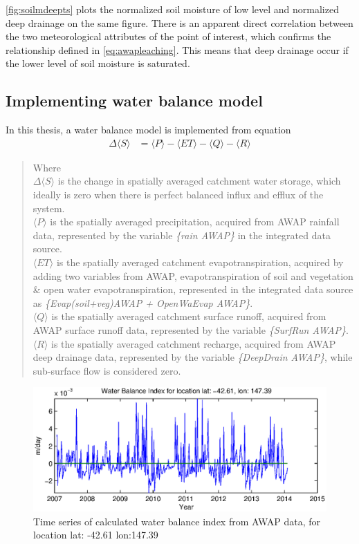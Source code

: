 \autoref{fig:soilmdeepts} plots the normalized soil moisture of low level and normalized deep drainage on the same figure. There is an apparent direct correlation between the two meteorological attributes of the point of interest, which confirms the relationship defined in \autoref{eq:awapleaching}. This means that deep drainage occur if the lower level of soil moisture is saturated.
\subsection{Implementing water balance model}
In this thesis, a water balance model is implemented from equation 
\begin{align}
	\Delta \langle S\rangle &= \langle P\rangle - \langle ET\rangle-\langle Q\rangle-\langle R\rangle
	\label{eq:wbsimple}
\end{align}
\begin{quote}Where \\
\indent$\Delta \langle S\rangle$ is the change in spatially averaged catchment water storage, which ideally is zero when there is perfect balanced influx and efflux of the system.\\
\indent$\langle P\rangle$ is the spatially averaged precipitation, acquired from AWAP rainfall data, represented by the variable \emph{\{rain AWAP\}} in the integrated data source.\\
\indent$\langle ET\rangle$ is the spatially averaged catchment evapotranspiration, acquired by adding two variables from AWAP, evapotranspiration of soil and vegetation \& open water evapotranspiration, represented in the integrated data source as \emph{\{Evap(soil+veg)AWAP + OpenWaEvap AWAP\}}.\\
\indent$\langle Q\rangle$ is the spatially averaged catchment surface runoff, acquired from AWAP surface runoff data, represented by the variable \emph{\{SurfRun AWAP\}}.\\
\indent$\langle R\rangle$ is the spatially averaged catchment recharge, acquired from AWAP deep drainage data, represented by the variable \emph{\{DeepDrain AWAP\}}, while sub-surface flow is considered zero.
\end{quote}
\begin{figure}[hbt]
\begin{center}
\includegraphics[width=\linewidth]{gfx/waterts.eps}
\end{center}
\caption{Time series of calculated water balance index from AWAP data, for location lat: -42.61 lon:147.39}
\label{fig:waterts}
\end{figure}
